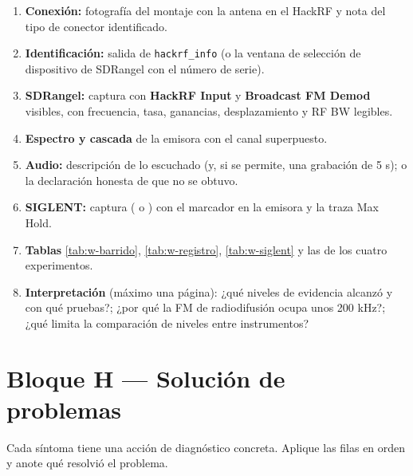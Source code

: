 \begin{entregable}[Laboratorio 01]
\begin{enumerate}
  \item \textbf{Conexión:} fotografía del montaje con la antena en el HackRF y nota del tipo de conector identificado.
  \item \textbf{Identificación:} salida de \texttt{hackrf\_info} (o la ventana de selección de dispositivo de SDRangel con el número de serie).
  \item \textbf{SDRangel:} captura con \textbf{HackRF Input} y \textbf{Broadcast FM Demod} visibles, con frecuencia, tasa, ganancias, desplazamiento y RF BW legibles.
  \item \textbf{Espectro y cascada} de la emisora con el canal superpuesto.
  \item \textbf{Audio:} descripción de lo escuchado (y, si se permite, una grabación de 5 s); o la declaración honesta de que no se obtuvo.
  \item \textbf{SIGLENT:} captura ( o ) con el marcador en la emisora y la traza Max Hold.
  \item \textbf{Tablas} \ref{tab:w-barrido}, \ref{tab:w-registro}, \ref{tab:w-siglent} y las de los cuatro experimentos.
  \item \textbf{Interpretación} (máximo una página): ¿qué niveles de evidencia alcanzó y con qué pruebas?; ¿por qué la FM de radiodifusión ocupa unos 200 kHz?; ¿qué limita la comparación de niveles entre instrumentos?
\end{enumerate}
\end{entregable}

\section{Bloque H --- Solución de problemas}
\label{sec:w-diag2}

Cada síntoma tiene una acción de diagnóstico concreta. Aplique las filas en orden y anote qué resolvió el problema.

